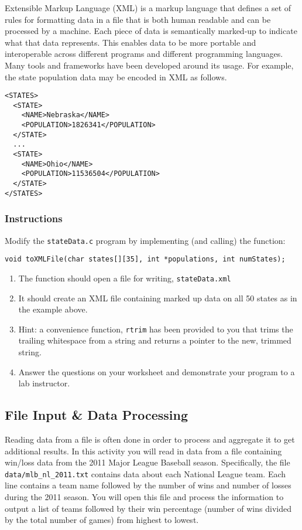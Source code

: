 \documentclass[12pt]{scrartcl}
\begin{document}
Extensible Markup Language (XML) is a markup language that defines a set 
of rules for formatting data in a file that is both human readable and can be 
processed by a machine.  Each piece of data is semantically marked-up to 
indicate what that data represents.  This enables data to be more portable 
and interoperable across different programs and different programming 
languages.  Many tools and frameworks have been developed around its 
usage.  For example, the state population data may be encoded in XML 
as follows.

\begin{verbatim}
<STATES>
  <STATE>
    <NAME>Nebraska</NAME>
    <POPULATION>1826341</POPULATION>
  </STATE>
  ...
  <STATE>
    <NAME>Ohio</NAME>
    <POPULATION>11536504</POPULATION>
  </STATE>
</STATES>
\end{verbatim}

\subsubsection*{Instructions}

Modify the \texttt{stateData.c} program by implementing 
(and calling) the function:

\texttt{void toXMLFile(char states[][35], int *populations, int numStates);}

\begin{enumerate}
  \item The function should open a file for writing, \texttt{stateData.xml}
  \item It should create an XML file containing marked up data on all 50 states 
	as in the example above.  
  \item Hint: a convenience function, \texttt{rtrim} has been provided 
	to you that trims the trailing whitespace from a string and returns a pointer 
	to the new, trimmed string.
  \item Answer the questions on your worksheet and demonstrate your program 
	to a lab instructor.
\end{enumerate}
	
\subsection{File Input \& Data Processing}

Reading data from a file is often done in order to process and aggregate it to 
get additional results.  In this activity you will read in data from a file containing 
win/loss data from the 2011 Major League Baseball season.  Specifically, the 
file \texttt{data/mlb_nl_2011.txt} contains data about each National League 
team.  Each line contains a team name followed by the number of wins and 
number of losses during the 2011 season.  You will open this file and process 
the information to output a list of teams followed by their win percentage 
(number of wins divided by the total number of games) from highest to lowest.
\end{document}
